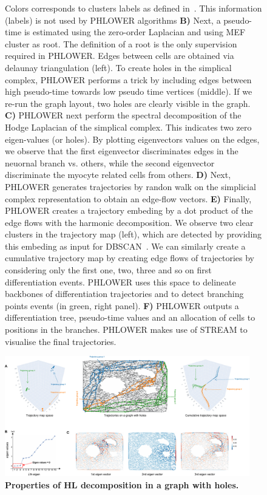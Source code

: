 \begin{figure}[!ht]
{  Colors corresponds to clusters labels as defined in~\citep{treutlein2016dissecting}. This information (labels) is not used by PHLOWER algorithms \textbf{B)} Next, a pseudo-time is estimated using the zero-order Laplacian and using MEF cluster as root. The definition of a root is the only supervision required in PHLOWER. Edges between cells are obtained via delaunay triangulation (left).  To create holes in the simplical complex, PHLOWER performs a trick by including edges between high pseudo-time towards low pseudo time vertices (middle). If we re-run the graph layout, two holes are clearly visible in the graph. \textbf{C)} PHLOWER next perform the spectral decomposition of the Hodge Laplacian of the simplical complex. This indicates two zero eigen-values (or holes). By plotting eigenvectors values on the edges, we observe that the first eigenvector discriminates edges in the neuornal branch vs. others, while the second eigenvector discriminate the myocyte related cells from others. \textbf{D)} Next, PHLOWER generates trajectories by randon walk on the simplicial complex representation to obtain an edge-flow vectors. \textbf{E)} Finally, PHLOWER creates a trajectory embeding by a dot product of the edge flows with the harmonic decomposition. We observe two clear clusters in the trajectory map (left), which are detected by providing this embeding as input for DBSCAN~\citep{ester1996dbscan}.  We can similarly create a cumulative trajectory map by creating edge flows of trajectories by considering only the first one, two, three and so on first differentiation events. PHLOWER uses this space to delineate backbones of differentiation trajectories and to detect branching points events (in green, right panel). \textbf{F)} PHLOWER outputs a differentiation tree, pseudo-time values and an allocation of cells to positions in the branches. PHLOWER makes use of STREAM to visualise the final trajectories.}
  \label{supfig:fib2neuron-workflow}
\end{figure}

\begin{figure}[!ht]
  \centering
  \includegraphics[width=0.95\textwidth]{toy_harmonic/fig}
  \vspace{0.1cm}
  \caption[Properties of HL decomposition in a graph with holes.]{\textbf{Properties of HL decomposition in a graph with holes.} }
  \label{supfig:toy-properties}
\end{figure}



